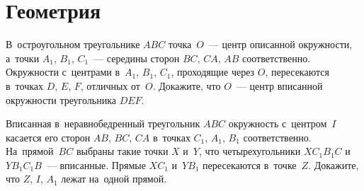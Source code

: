 \section*{Геометрия}



\begingroup\providecommand\ifincludesolutions{\iffalse}

\ifincludesolutions
\subsection*{Версия с решениями}
\fi

\begin{problems}

\item
В~остроугольном треугольнике $ABC$ точка~$O$~— центр описанной окружности,
а~точки $A_1$, $B_1$, $C_1$~— середины сторон $BC$, $CA$, $AB$
соответственно.
Окружности с~центрами в~$A_1$, $B_1$, $C_1$, проходящие через $O$, пересекаются
в~точках $D$, $E$, $F$, отличных от~$O$.
Докажите, что $O$~— центр вписанной окружности треугольника $DEF$.

\end{problems}

\ifincludesolutions
Пусть $D$~— отличная от~$O$ точка пересечения окружностей $\omega_B$
и~$\omega_C$ с~центрами $B_1$ и~$C_1$ из~условия;
$E$~— $\omega_C$ и~$\omega_B$; аналогично $F$.
Достаточно показать, что $DO$~— биссектриса угла $EDF$
(прямые $EO$ и~$FO$ также будут биссектрисами своих углов и~$O$ будет точкой
пересечения биссектрис).
Заметим, что $\angle EDO = \frac{1}{2} \angle E C_1 O = \angle O C_1 B_1$.
Первое равенство~— соотношение вписанного и~центрального углов окружности
$\omega_C$, второе вытекает из~равенства треугольников
$E C_1 B_1$ и~$O C_1 B_1$.
Аналогично $\angle FDO = \frac{1}{2} \angle F A_1 O = \angle O A_1 B_1$.
Общеизвестно, что центр~$O$ описанной окружности треугольника $ABC$ является
также точкой пересечения высот треугольника $A_1B_1C_1$, а~значит $\angle
OC_1B_1 = 90^{\circ} - \angle C_1 B_1 A_1 = \angle O A_1 B_1$.
Из~выписанных равенств следует, что $\angle EDO = \angle FDO$ и~что прямая~$DO$
действительно является биссектрисой угла $EDF$.
\fi %

\begin{problems}

\item
Вписанная в~неравнобедренный треугольник $ABC$ окружность с~центром~$I$
касается его сторон $AB$, $BC$, $CA$ в~точках $C_1$, $A_1$, $B_1$
соответственно.
На~прямой~$BC$ выбраны такие точки $X$ и~$Y$, что четырехугольники
$X C_1 B_1C$ и $Y B_1 C_1B$~— вписанные.
Прямые $X C_1$ и~$Y B_1$ пересекаются в~точке~$Z$.
Докажите, что $Z$, $I$, $A_1$ лежат на~одной прямой.

\end{problems}

